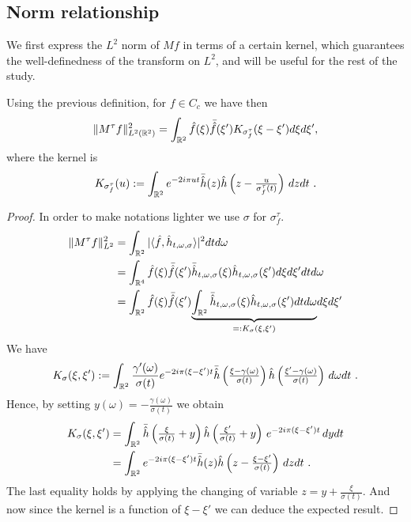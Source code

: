 \subsection{Norm relationship}

We first express the $L^2$ norm of $Mf$ in terms of a certain kernel, which guarantees the well-definedness of the transform on $L^2$, and will be  useful for the rest of the study.

\begin{prop}
    Using the previous definition, for $f\in C_c$ we have then
	\begin{equation}
		\|M^\tau f\|_{L^2(\mathbb{R}^2)}^2 = \int_{\mathbb{R}^2} \hat{f}(\xi)\bar{\hat{f}}(\xi') K_{\sigma_f^\tau}(\xi-\xi') d\xi d\xi',
	\end{equation}
	where the  kernel is 
	\begin{equation}\label{eq_def_time_kernel}
		K_{\sigma_f^\tau}(u) := \int_{\mathbb{R}^2}e^{-2i\pi u t}\bar{\hat{h}}(z)\hat{h}\left(z-\tfrac{u}{\sigma_f^\tau(t)}\right)\, dzdt\ .
	\end{equation}
\end{prop}
\begin{proof}
	In order to make notations lighter we use $\sigma$ for $\sigma_f^\tau$.
	\begin{align*}
		\|M^\tau f\|_{L^2}^2 & = \int_{\mathbb{R}^2} |\langle \hat{f},\hat{h}_{t,\omega,\sigma}\rangle|^2dtd\omega \\
		& = \int_{\mathbb{R}^4} \hat{f}(\xi)\bar{\hat{f}}(\xi')\bar{\hat{h}}_{t,\omega,\sigma}(\xi)\hat{h}_{t,\omega,\sigma}(\xi') d\xi d\xi' dt d\omega \\
		& = \int_{\mathbb{R}^2}\hat{f}(\xi)\bar{\hat{f}}(\xi') \underset{=:K_{\sigma}(\xi,\xi')}{\underbrace{\int_{\mathbb{R}^2}\bar{\hat{h}}_{t,\omega,\sigma}(\xi)\hat{h}_{t,\omega,\sigma}(\xi')dt d\omega}} d\xi d\xi'
	\end{align*}
	We have
	\begin{equation*}
		K_{\sigma}(\xi,\xi'):= \int_{\mathbb{R}^2}\frac{\gamma'(\omega)}{\sigma(t)}e^{-2i\pi(\xi-\xi')t}\bar{\hat{h}}\left(\tfrac{\xi-\gamma(\omega)}{\sigma(t)}\right)\hat{h}\left(\tfrac{\xi'-\gamma(\omega)}{\sigma(t)}\right)\,d\omega dt\ .
	\end{equation*}
	Hence, by setting $y(\omega)=-\frac{\gamma(\omega)}{\sigma(t)}$ we obtain
	\begin{align*}
		K_{\sigma}(\xi,\xi') &= \int_{\R^2} \bar{\hat{h}}\left(\tfrac{\xi}{\sigma(t)}+y\right)\hat{h}\left(\tfrac{\xi'}{\sigma(t)}+y\right)\,e^{-2i\pi(\xi-\xi')t}\,dydt \\
		&= \int_{\R^2}e^{-2i\pi(\xi-\xi')t} \bar{\hat{h}}(z)\hat{h}\left(z-\tfrac{\xi-\xi'}{\sigma(t)}\right)\,dzdt\ .
	\end{align*}
	The last equality holds by applying the changing of variable $z=y+\frac{\xi}{\sigma(t)}$. And now since the kernel is a function of $\xi-\xi'$ we can deduce the expected result.
\end{proof}

